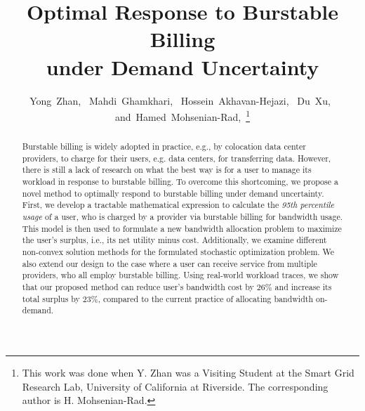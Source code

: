 \documentclass[10pt,journal,compsoc]{IEEEtran}
\begin{document}
\title{Optimal Response to Burstable Billing \\ under Demand Uncertainty}


\author{Yong~Zhan,~
        Mahdi~Ghamkhari,~
        Hossein~Akhavan-Hejazi,~
        Du~Xu,~
        and~Hamed~Mohsenian-Rad,~\thanks{This work was done when Y. Zhan was a Visiting Student at the Smart Grid Research Lab, University of California at Riverside. The corresponding author is H. Mohsenian-Rad.}}





















\maketitle
\begin{abstract}
Burstable billing is widely adopted in practice, e.g., by colocation data center providers, to charge for their users, e.g. data centers, for  transferring data. However, there is still a lack of research on what the best way is for a user to manage its workload in response to burstable billing. To overcome this shortcoming, we propose a novel method to optimally respond to burstable billing under demand uncertainty. First, we develop a tractable mathematical expression to calculate the \emph{95th percentile usage} of a user, who is charged by a provider via burstable billing for bandwidth usage. This model is then used to formulate a new bandwidth allocation problem to maximize the user's surplus, i.e., its net utility minus cost.
Additionally, we  examine different non-convex solution methods for the formulated stochastic optimization problem.
 We also extend our design to the case where a user can receive service from multiple providers, who all employ burstable billing. Using real-world workload traces, we show that our proposed method can reduce user's bandwidth cost by $26\%$ and increase its total surplus by $23\%$,  compared to the current practice of allocating bandwidth on-demand.
\end{abstract}
\end{document}
